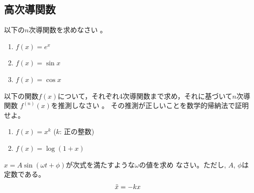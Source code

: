 \documentclass[twocolumn,11pt]{jarticle}
\begin{document}
\subsection{高次導関数}

\nquestion
以下の$n$次導関数を求めなさい
。
\begin{enumerate}
\item\label{Ditem:e^x} $f(x)=e^x$
\item\label{Ditem:sinx} $f(x)=\sin x$
\item\label{Ditem:cosx} $f(x)=\cos x$
\end{enumerate}
\nquestion
以下の関数$f(x)$について，それぞれ4次導関数まで求め，それに基づいて$n$次導関数
$f^{(n)}(x)$を推測しなさい
。
その推測が正しいことを数学的帰納法で証明せよ。
\begin{enumerate}
\item\label{eq:fnOFx^k} $f(x)=x^k$ ($k$: 正の整数)
\item\label{eq:fvOFlog(1+x)} $f(x)=\log (1+x)$
\end{enumerate}
\nquestion
$x=A\sin(\omega t+\phi)$が次式を満たすような$\omega$の値を求め
なさい。ただし, $A$, $\phi$は定数である。
\begin{align}
  \ddot{x}=-kx\notag
\end{align}
\end{document}
